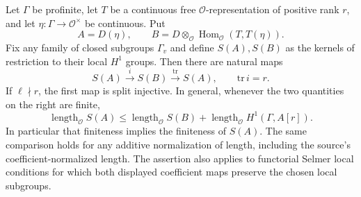 \begin{proposition}
\label{AC-G44-trace}
Let $\Gamma$ be profinite, let $T$ be a continuous free
$\mathcal O$-representation of positive rank $r$, and let
$\eta:\Gamma\to\mathcal O^\times$ be continuous.  Put
\[
 A=D(\eta),\qquad
 B=D\otimes_{\mathcal O}\operatorname{Hom}_{\mathcal O}
                      (T,T(\eta)).                    \tag{G44.4}
\]
Fix any family of closed subgroups $\Gamma_v$ and define
$S(A),S(B)$ as the kernels of restriction to their local
$H^1$ groups.  Then there are natural maps
\[
 S(A)\xrightarrow{\ i\ }S(B)\xrightarrow{\ \mathrm{tr}\ }S(A),
 \qquad \mathrm{tr}\,i=r.                              \tag{G44.5}
\]
If $\ell\nmid r$, the first map is split injective.
In general, whenever the two quantities on the right are finite,
\[
 \operatorname{length}_{\mathcal O}S(A)
 \le \operatorname{length}_{\mathcal O}S(B)
       +\operatorname{length}_{\mathcal O}
                         H^1(\Gamma,A[r]).             \tag{G44.6}
\]
In particular that finiteness implies the finiteness of $S(A)$.
The same comparison holds for any additive normalization of
length, including the source's coefficient-normalized length.
The assertion also applies to functorial Selmer local conditions
for which both displayed coefficient maps preserve the chosen
local subgroups.
\end{proposition}
